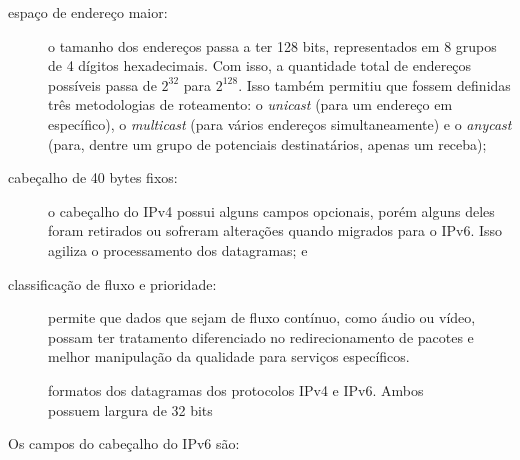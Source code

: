 \begin{description}
    \item[espaço de endereço maior:] o tamanho dos endereços passa a ter 128 bits,
        representados em 8 grupos de 4 dígitos hexadecimais. Com isso, a quantidade
        total de endereços possíveis passa de $2^32$ para $2^128$. Isso também permitiu
        que fossem definidas três metodologias de roteamento: o \emph{unicast} (para um
        endereço em específico), o \emph{multicast} (para vários endereços
        simultaneamente) e o \emph{anycast} (para, dentre um grupo de potenciais
        destinatários, apenas um receba);

    \item[cabeçalho de 40 bytes fixos:] o cabeçalho do IPv4 possui alguns campos
        opcionais, porém alguns deles foram retirados ou sofreram alterações quando
        migrados para o IPv6. Isso agiliza o processamento dos datagramas; e

    \item[classificação de fluxo e prioridade:] permite que dados que sejam de fluxo
        contínuo, como áudio ou vídeo, possam ter tratamento diferenciado no
        redirecionamento de pacotes e melhor manipulação da qualidade para serviços
        específicos.
\end{description}

\begin{figure}[H]
    \centering
    \caption{formatos dos datagramas dos protocolos IPv4 e IPv6. Ambos possuem largura de 32 bits}
    \label{fig:headers}
\end{figure}

Os campos do cabeçalho do IPv6 são:

